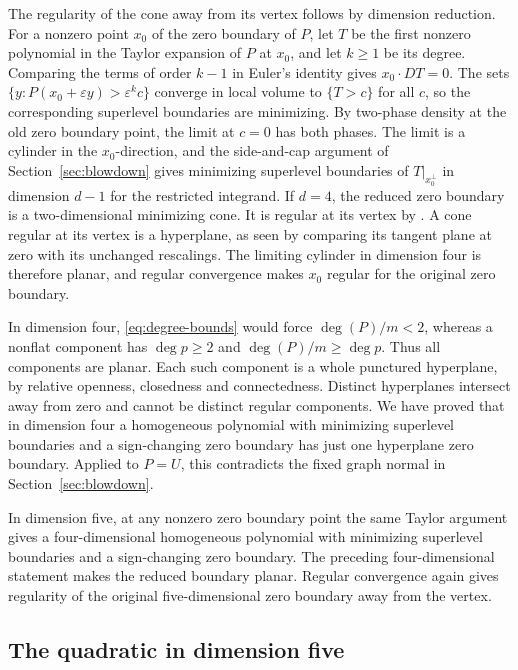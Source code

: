 \documentclass[11pt]{amsart}
\begin{document}
The regularity of the cone away from its vertex follows by dimension reduction. For a nonzero
point \(x_0\) of the zero boundary of \(P\), let \(T\) be the first
nonzero polynomial in the Taylor expansion of \(P\) at \(x_0\), and
let \(k\ge1\) be its degree. Comparing the terms of order \(k-1\) in
Euler's identity gives \(x_0\cdot DT=0\). The sets
\(\{y:P(x_0+\varepsilon y)>\varepsilon^k c\}\) converge in local
volume to \(\{T>c\}\) for all \(c\), so the corresponding superlevel
boundaries are minimizing. By two-phase density at the old zero boundary point,
the limit at \(c=0\) has both phases. The limit is a cylinder in
the \(x_0\)-direction, and the side-and-cap argument of Section~\ref{sec:blowdown}
gives minimizing superlevel boundaries of \(T|_{x_0^\perp}\) in dimension \(d-1\)
for the restricted integrand. If \(d=4\), the reduced zero boundary
is a two-dimensional minimizing cone. It is regular at its vertex
by \cite[Part~I, Corollary~3.2 and the following remark]{SSA}. A cone regular at its vertex is a
hyperplane, as seen by comparing its tangent plane at zero with
its unchanged rescalings. The limiting cylinder in dimension four
is therefore planar, and regular convergence makes \(x_0\) regular
for the original zero boundary.

In dimension four, \eqref{eq:degree-bounds} would force \(\deg(P)/m<2\), whereas a
nonflat component has \(\deg p\ge2\) and \(\deg(P)/m\ge\deg p\).
Thus all components are planar. Each such component is a whole
punctured hyperplane, by relative openness, closedness and
connectedness. Distinct hyperplanes intersect away from zero and
cannot be distinct regular components. We have proved that in
dimension four a homogeneous polynomial with minimizing superlevel
boundaries and a sign-changing zero boundary has just one
hyperplane zero boundary. Applied to \(P=U\), this contradicts
the fixed graph normal in Section~\ref{sec:blowdown}.

In dimension five, at any nonzero zero boundary point the same
Taylor argument gives a four-dimensional homogeneous polynomial
with minimizing superlevel boundaries and a sign-changing zero boundary.
The preceding four-dimensional statement makes the reduced
boundary planar. Regular convergence again gives regularity of
the original five-dimensional zero boundary away from the vertex.

\subsection{The quadratic in dimension five}
\end{document}
